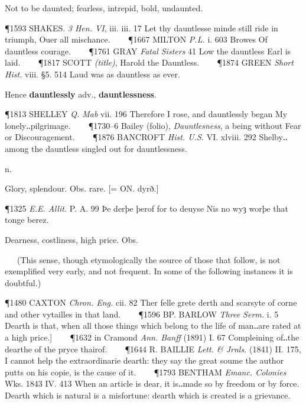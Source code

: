 \begin{description}[wide, labelwidth=!, labelindent=0pt]
Not to be daunted; fearless, intrepid, bold, undaunted.

\P 1593 SHAKES.  \textit{3 Hen. VI}, iii. iii. 17 Let thy dauntlesse minde still ride in triumph, Ouer all mischance.    
\P 1667 MILTON  \textit{P.L.} i. 603 Browes Of dauntless courage.    
\P 1761 GRAY  \textit{Fatal Sisters} 41 Low the dauntless Earl is laid.    
\P 1817 SCOTT  \textit{(title)}, Harold the Dauntless.    
\P 1874 GREEN  \textit{Short Hist.} viii. §5. 514 Laud was as dauntless as ever.

Hence \textbf{dauntlessly} adv., \textbf{dauntlessness}.

\P 1813 SHELLEY  \textit{Q. Mab} vii. 196 Therefore I rose, and dauntlessly began My lonely‥pilgrimage.    
\P 1730–6 Bailey (folio), \textit{Dauntlesness}, a being without Fear or Discouragement.    
\P 1876 BANCROFT  \textit{Hist. U.S.} VI. xlviii. 292 Shelby‥among the dauntless singled out for dauntlessness.




 n.

\noindent {}


\vspace{-0.3cm}

\begin{myenumerate}
 Glory, splendour. Obs. rare. [= ON. dyrð.]

\P 1325  \textit{E.E. Allit.} P. A. 99 Þe derþe þerof for to deuyse Nis no wyȝ worþe that tonge berez.

 Dearness, costliness, high price. Obs.

   (This sense, though etymologically the source of those that follow, is not exemplified very early, and not frequent. In some of the following instances it is doubtful.)

\P 1480 CAXTON  \textit{Chron. Eng.} cii. 82 Ther felle grete derth and scarsyte of corne and other vytailles in that land.    
\P 1596 BP. BARLOW  \textit{Three Serm.} i. 5 Dearth is that, when all those things which belong to the life of man‥are rated at a high price.]    
\P 1632 in  Cramond \textit{Ann. Banff} (1891) I. 67 Compleining of‥the dearthe of the pryce thairof.    
\P 1644 R. BAILLIE  \textit{Lett. \& Jrnls.} (1841) II. 175, I cannot help the extraordinarie dearth: they say the great soume the author putts on his copie, is the cause of it.    
\P 1793 BENTHAM  \textit{Emanc. Colonies} Wks. 1843 IV. 413  When an article is dear, it is‥made so by freedom or by force. Dearth which is natural is a misfortune: dearth which is created is a grievance.


\end{myenumerate}
\end{description}
